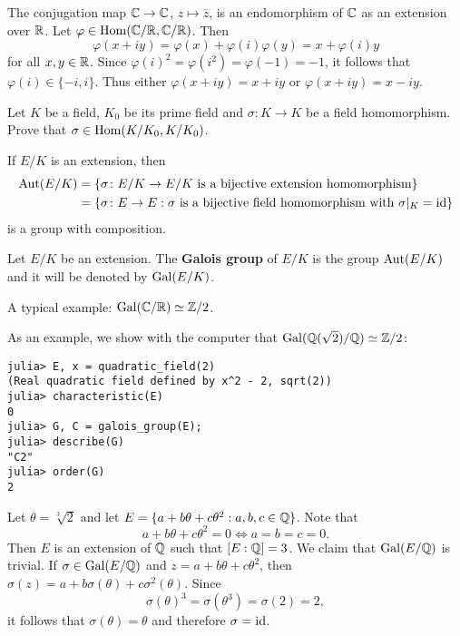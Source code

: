 \begin{example}
	The conjugation map $\mathbb{C}\to\mathbb{C}$, $z\mapsto\overline{z}$, 
	is an endomorphism of $\mathbb{C}$ as an extension over $\mathbb{R}$. Let 
	$\varphi\in\operatorname{Hom}(\mathbb{C}/\mathbb{R},\mathbb{C}/\mathbb{R})$. Then 
	\[
	\varphi(x+iy)=\varphi(x)+\varphi(i)\varphi(y)=x+\varphi(i)y
	\]
	for all $x,y\in\mathbb{R}$. Since $\varphi(i)^2=\varphi(i^2)=\varphi(-1)=-1$, 
	it follows that $\varphi(i)\in\{-i,i\}$. Thus either 
	$\varphi(x+iy)=x+iy$ or $\varphi(x+iy)=x-iy$. 
\end{example}

\begin{exercise}
	Let $K$ be a field, $K_0$ be its prime field 
        and $\sigma\colon K\to K$ be a field homomorphism. Prove that 
        $\sigma\in\operatorname{Hom}(K/K_0,K/K_0)$. 
\end{exercise}

If $E/K$ is an extension, then
\begin{align*}
	\operatorname{Aut}(E/K)&=\{\sigma\colon E/K\to E/K\text{ is a bijective extension homomorphism}\}\\
 &=\{\sigma\colon E\to E:\sigma\text{ is a bijective field homomorphism with $\sigma|_K=\operatorname{id}$}\}
\end{align*}
is a group with composition.

\begin{definition}
	Let $E/K$ be an extension. The \textbf{Galois group}
	of $E/K$ is the group
	$\operatorname{Aut}(E/K)$ and it will be denoted by $\operatorname{Gal}(E/K)$. 
\end{definition}

A typical example: $\operatorname{Gal}(\mathbb{C}/\mathbb{R})\simeq\mathbb{Z}/2$. 

As an example, we show with the computer that $\operatorname{Gal}(\mathbb{Q}(\sqrt{2})/\mathbb{Q})\simeq\mathbb{Z}/2$:
\begin{lstlisting}
julia> E, x = quadratic_field(2)
(Real quadratic field defined by x^2 - 2, sqrt(2))
julia> characteristic(E)
0
julia> G, C = galois_group(E);
julia> describe(G)
"C2"
julia> order(G)
2
\end{lstlisting}

\begin{example}
	Let $\theta=\sqrt[3]{2}$ and let $E=\{a+b\theta+c\theta^2:a,b,c\in\mathbb{Q}\}$. Note that 
\[
	a+b\theta+c\theta^2=0 \Longleftrightarrow a=b=c=0. 
\]
Then $E$ is an extension of $\mathbb{Q}$ such that $[E:\mathbb{Q}]=3$. We claim
that $\operatorname{Gal}(E/\mathbb{Q})$ is trivial. If 
$\sigma\in\operatorname{Gal}(E/\mathbb{Q})$ and $z=a+b\theta+c\theta^2$, then
$\sigma(z)=a+b\sigma(\theta)+c\sigma^2(\theta)$. Since
\[
\sigma(\theta)^3=\sigma(\theta^3)=\sigma(2)=2,
\]
it follows
that $\sigma(\theta)=\theta$ and therefore
$\sigma=\operatorname{id}$. 
\end{example}

